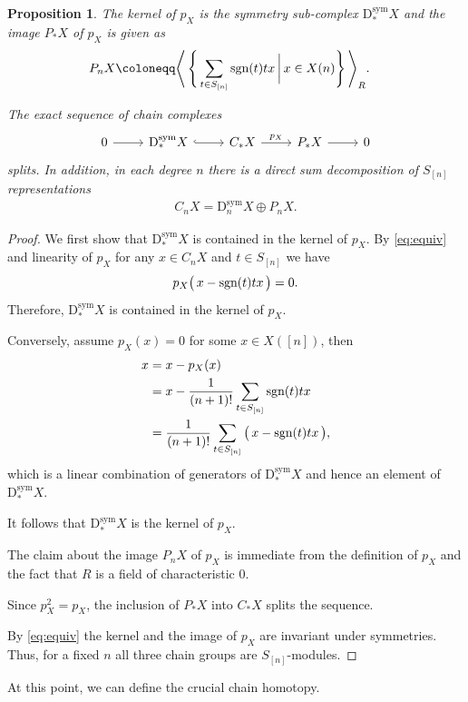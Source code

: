 \documentclass[12pt]{amsart}
\theoremstyle{plain}
\numberwithin{lemma}{\DefaultNumberTheoremWithin}
\numberwithin{claim}{\DefaultNumberTheoremWithin}
\numberwithin{theorem}{\DefaultNumberTheoremWithin}
\numberwithin{corollary}{\DefaultNumberTheoremWithin}
\newtheorem{proposition}{Proposition}
\numberwithin{proposition}{\DefaultNumberTheoremWithin}
\numberwithin{conjecture}{\DefaultNumberTheoremWithin}
\theoremstyle{definition}
\theoremstyle{definition}
\numberwithin{question}{\DefaultNumberTheoremWithin}
\theoremstyle{definition}
\numberwithin{problem}{\DefaultNumberTheoremWithin}
\theoremstyle{remark}
\numberwithin{remark}{\DefaultNumberTheoremWithin}
\theoremstyle{remark}
\numberwithin{example}{\DefaultNumberTheoremWithin}
\def\blt{*}
\def\letbe{\coloneqq}
\def\sgn{\textnormal{sgn}}
\def\Deg{\mathrm{D}}    %
\def\sDeg{\Deg^{\mathrm{sym}}}  %
\newcommand{\Sym}[1]{S_{[#1]}}
\begin{document}
\begin{proposition}\label{SymSplit}
The kernel of $p_X$ is the symmetry sub-complex $\sDeg_\blt X$ and the image $P_\blt X$ of $p_X$ is given as 
\begin{align*}
     P_nX\letbe&\Bigg\langle\, \Bigg\{ \sum_{t \in \Sym{n}} \sgn(t) tx \,\bigg\vert\, x\in X(n)\Bigg \}\, \Bigg\rangle_{R}.
\end{align*}

The exact sequence of chain complexes
  \[
   \begin{tikzcd}
    0\arrow{r}{}&\sDeg_\blt X\arrow[hook]{r}{} &C_\blt X\arrow{r}{p_X}&P_\blt X \arrow{r}&0
    \end{tikzcd}
\]
splits. In addition, in each degree $n$ there is a direct sum decomposition of $\Sym{n}$ representations
\begin{align*}
C_nX=\sDeg_nX\oplus P_nX.
\end{align*}
\end{proposition}
\begin{proof}
We first show that $\sDeg_\blt X$ is contained in the
kernel of $p_X$.  By \eqref{eq:equiv} and linearity of $p_X$ for any $x\in C_nX$ and  $t\in \Sym{n}$ we have
 $$p_X\big(\,x-\sgn(t)tx\,\big)=0.$$ Therefore, $\sDeg_\blt X$ is contained in the kernel of $p_X$. 

Conversely, assume $p_X(x)=0$
for some $x \in X([n])$, then 
\begin{align*}
    x&=x-p_X(x)\\
    &=x-\frac{1}{(n+1)!}\sum_{t \in \Sym{n}} \sgn(t)t x\\
    &=\frac{1}{(n+1)!}\sum_{t \in \Sym{n}} \big(\,x- \sgn(t)t x\,\big),
\end{align*}
which is a linear combination of generators of 
$\sDeg_\blt X$ and hence an element of
$\sDeg_\blt X$. 

It follows that $\sDeg_\blt X$ is the kernel of $p_X$.

The claim about the image $P_nX$ of $p_X$ is immediate
from the definition of $p_X$ and the fact that $R$ is
a field of characteristic $0$. 

Since $p_X^2=p_X$, the inclusion of $P_\blt X$ into $C_\blt X$ splits the sequence.

 By \eqref{eq:equiv} the kernel and the image of $p_X$ 
    are invariant under symmetries.
    Thus, for a fixed $n$ all three chain groups are $\Sym{n}$-modules.
\end{proof}

At this point, we can define the crucial chain homotopy.
\end{document}
